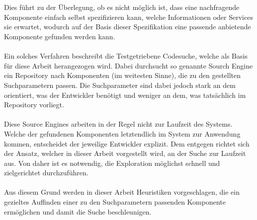 \\\\
Dies führt zu der Überlegung, ob es nicht möglich ist, dass eine nachfragende Komponente einfach selbst spezifizieren kann, welche Informationen oder Services sie erwartet, wodurch auf der Basis dieser Spezifikation eine passende anbietende Komponente gefunden werden kann.
\\\\
Ein solches Verfahren beschreibt die Testgetriebene Codesuche, welche als Basis für diese Arbeit herangezogen wird. Dabei durchsucht so genannte Sourch Engine ein Repository nach Komponenten (im weitesten Sinne), die zu den gestellten Suchparametern passen. Die Suchparameter sind dabei jedoch stark an dem orientiert, was der Entwickler benötigt und weniger an dem, was tatsächlich im Repository vorliegt.
\\\\
Diese Source Engines arbeiten in der Regel nicht zur Laufzeit des Systems. Welche der gefundenen Komponenten letztendlich im System zur Anwendung kommen, entscheidet der jeweilige Entwickler explizit. Dem entgegen richtet sich der Ansatz, welcher in dieser Arbeit vorgestellt wird, an der Suche zur Laufzeit aus. Von daher ist es notwendig, die Exploration möglichst schnell und zielgerichtet durchzuführen.
\\\\
Aus diesem Grund werden in dieser Arbeit Heuristiken vorgeschlagen, die ein gezieltes Auffinden einer zu den Suchparametern passenden Komponente ermöglichen und damit die Suche beschleunigen.

